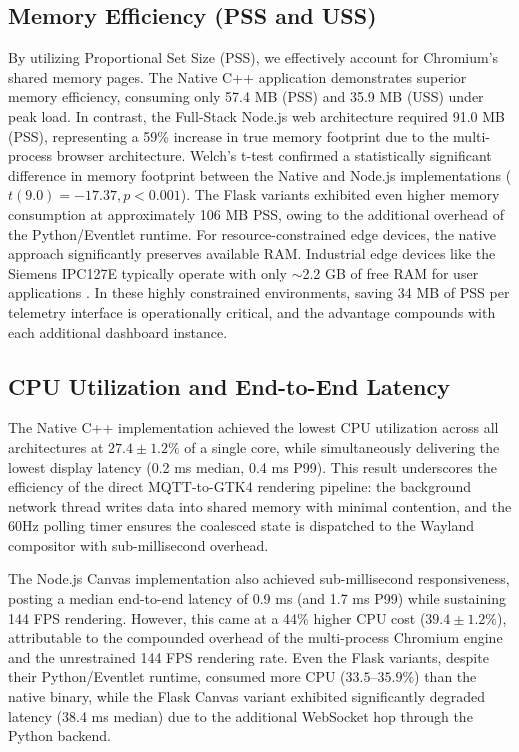\documentclass[lettersize,journal]{IEEEtran}
\begin{document}
\subsection{Memory Efficiency (PSS and USS)}
By utilizing Proportional Set Size (PSS), we effectively account for Chromium's shared memory pages. The Native C++ application demonstrates superior memory efficiency, consuming only 57.4 MB (PSS) and 35.9 MB (USS) under peak load. In contrast, the Full-Stack Node.js web architecture required 91.0 MB (PSS), representing a 59\% increase in true memory footprint due to the multi-process browser architecture. Welch's t-test confirmed a statistically significant difference in memory footprint between the Native and Node.js implementations ($t(9.0) = -17.37, p < 0.001$). The Flask variants exhibited even higher memory consumption at approximately 106 MB PSS, owing to the additional overhead of the Python/Eventlet runtime. For resource-constrained edge devices, the native approach significantly preserves available RAM. Industrial edge devices like the Siemens IPC127E typically operate with only $\sim$2.2 GB of free RAM for user applications \cite{b6}. In these highly constrained environments, saving 34 MB of PSS per telemetry interface is operationally critical, and the advantage compounds with each additional dashboard instance.

\subsection{CPU Utilization and End-to-End Latency}
The Native C++ implementation achieved the lowest CPU utilization across all architectures at $27.4 \pm 1.2\%$ of a single core, while simultaneously delivering the lowest display latency (0.2 ms median, 0.4 ms P99). This result underscores the efficiency of the direct MQTT-to-GTK4 rendering pipeline: the background network thread writes data into shared memory with minimal contention, and the 60Hz polling timer ensures the coalesced state is dispatched to the Wayland compositor with sub-millisecond overhead.

The Node.js Canvas implementation also achieved sub-millisecond responsiveness, posting a median end-to-end latency of 0.9 ms (and 1.7 ms P99) while sustaining 144 FPS rendering. However, this came at a 44\% higher CPU cost ($39.4 \pm 1.2\%$), attributable to the compounded overhead of the multi-process Chromium engine and the unrestrained 144 FPS rendering rate. Even the Flask variants, despite their Python/Eventlet runtime, consumed more CPU ($33.5$--$35.9\%$) than the native binary, while the Flask Canvas variant exhibited significantly degraded latency (38.4 ms median) due to the additional WebSocket hop through the Python backend.
\end{document}

